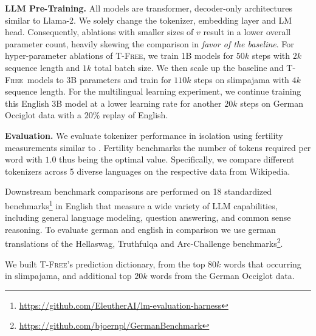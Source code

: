 \documentclass[11pt]{article}
\newcommand{\method}{\textsc{T-Free}}
\begin{document}
\textbf{LLM Pre-Training.}
All models are transformer, decoder-only architectures similar to Llama-2. We solely change the tokenizer, embedding layer and LM head. Consequently, ablations with smaller sizes of $v$ result in a lower overall parameter count, heavily skewing the comparison in \textit{favor of the baseline}. 
For hyper-parameter ablations of \method, we train 1B models for $50k$ steps with $2k$ sequence length and $1k$ total batch size.
We then scale up the baseline and \method\ models to 3B parameters and train for $110k$ steps on slimpajama with $4k$ sequence length. For the multilingual learning experiment, we continue training this English 3B model at a lower learning rate for another $20k$ steps on German Occiglot data with a $20\%$ replay of English.  

\textbf{Evaluation.} 
We evaluate tokenizer performance in isolation using fertility measurements similar to \citet{rust2021howGood}. Fertility benchmarks the number of tokens required per word with $1.0$ thus being the optimal value.
Specifically, we 
compare different tokenizers across 5 diverse languages on the respective data from Wikipedia. 

Downstream benchmark comparisons are performed on 18 standardized benchmarks\footnote{\scriptsize\url{https://github.com/EleutherAI/lm-evaluation-harness}} in English that measure a wide variety of LLM capabilities, including general language modeling, question answering, and common sense reasoning. 
To evaluate german and english in comparison we use german translations of the Hellaswag, Truthfulqa and Arc-Challenge benchmarks\footnote{\url{https://github.com/bjoernpl/GermanBenchmark}}.

We built \method's prediction dictionary, from the top $80k$ words that occurring in slimpajama, and additional top $20k$ words from the German Occiglot data. 
\end{document}

